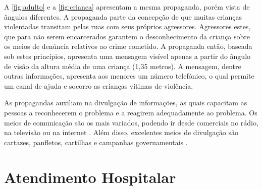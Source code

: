 A \autoref{fig:adulto} e a \autoref{fig:crianca} apresentam a mesma propaganda, porém vista de ângulos diferentes. A propaganda parte da concepção de que muitas crianças violentadas transitam pelas ruas com seus próprios agressores. Agressores estes, que para não serem encarcerados garantem o desconhecimento da criança sobre os meios de denúncia relativos ao crime cometido. A propaganda então, baseada sob estes princípios, apresenta uma mensagem visível apenas a partir do ângulo de visão da altura média de uma criança (1,35 metros). A mensagem, dentre outras informações, apresenta aos menores um número telefónico, o qual permite um canal de ajuda e socorro as crianças vítimas de violência. 

As propagandas auxiliam na divulgação de informações, as quais capacitam as pessoas a reconhecerem o problema e a reagirem adequadamente ao problema. Os meios de comunicação são os mais variados, podendo ir desde comerciais no rádio, na televisão ou na internet \cite{martinez2011prevencion}. Além disso, excelentes meios de divulgação são cartazes, panfletos, cartilhas e campanhas governamentais \cite{mendelson2015parent}.




\section{Atendimento Hospitalar}\label{sec:hospital}


